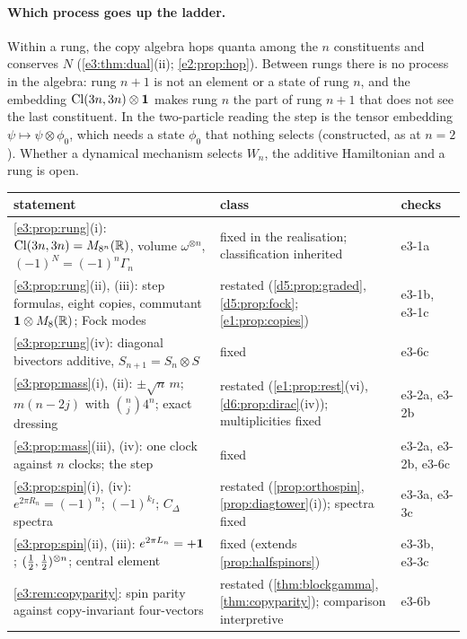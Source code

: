 \paragraph{Which process goes up the ladder.} Within a rung, the copy algebra hops quanta among the $n$ constituents and conserves $N$
(\cref{e3:thm:dual}(ii); \cref{e2:prop:hop}). Between rungs there is no process in the algebra: rung $n+1$ is not an element or a state of
rung $n$, and the embedding $\mathrm{Cl}(3n,3n)\otimes\mathbf 1$ makes rung $n$ the part of rung $n+1$ that does not see the last constituent. In the
two-particle reading the step is the tensor embedding $\psi\mapsto\psi\otimes\phi_0$, which needs a state $\phi_0$ that nothing selects
(constructed, as at $n=2$). Whether a dynamical mechanism selects $W_n$, the additive Hamiltonian and a rung is open.

\begin{table}[!htbp]
\centering
\footnotesize
\begin{tabular}{@{}>{\raggedright\arraybackslash}p{8.2cm}>{\raggedright\arraybackslash}p{4.5cm}>{\raggedright\arraybackslash}p{2.2cm}@{}}
\toprule
statement & class & checks\\
\midrule
\cref{e3:prop:rung}(i): $\mathrm{Cl}(3n,3n)=M_{8^n}(\mathbb{R})$, volume $\omega^{\otimes n}$, $(-1)^N=(-1)^n\Gamma_n$ & fixed in the realisation; classification inherited & e3-1a\\
\cref{e3:prop:rung}(ii), (iii): step formulas, eight copies, commutant $\mathbf 1\otimes M_8(\mathbb{R})$; Fock modes & restated (\cref{d5:prop:graded}, \cref{d5:prop:fock}; \cref{e1:prop:copies}) & e3-1b, e3-1c\\
\cref{e3:prop:rung}(iv): diagonal bivectors additive, $S_{n+1}=S_n\otimes S$ & fixed & e3-6c\\
\cref{e3:prop:mass}(i), (ii): $\pm\sqrt n\,m$; $m(n-2j)$ with $\binom nj4^n$; exact dressing & restated (\cref{e1:prop:rest}(vi), \cref{d6:prop:dirac}(iv)); multiplicities fixed & e3-2a, e3-2b\\
\cref{e3:prop:mass}(iii), (iv): one clock against $n$ clocks; the step & fixed & e3-2a, e3-2b, e3-6c\\
\cref{e3:prop:spin}(i), (iv): $e^{2\pi R_n}=(-1)^n$; $(-1)^{k_I}$; $C_\Delta$ spectra & restated (\cref{prop:orthospin}, \cref{prop:diagtower}(i)); spectra fixed & e3-3a, e3-3c\\
\cref{e3:prop:spin}(ii), (iii): $e^{2\pi L_n}=+\mathbf 1$; $(\tfrac12,\tfrac12)^{\otimes n}$; central element & fixed (extends \cref{prop:halfspinors}) & e3-3b, e3-3c\\
\cref{e3:rem:copyparity}: spin parity against copy-invariant four-vectors & restated (\cref{thm:blockgamma}, \cref{thm:copyparity}); comparison interpretive & e3-6b\\

\end{tabular}
\end{table}
